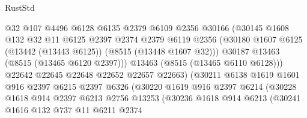 \begin{lexlean}{RustStd}
\begin{coremodule}
                              @32
                              @107
                              @4496
                              @6128
                              @6135
                              @2379
                              @6109
                              @2356
                              @30166
                              (@30145
                                @1608
                                @132
                                @32
                                @11
                                @6125
                                @2397
                                @2374
                                @2379
                                @6119
                                @2356
                                (@30180
                                  @1607
                                  @6125
                                  (@13442 (@13443 @6125))
                                  (@8515 (@13448 @1607 @32)))
                                @30187
                                @13463
                                (@8515 (@13465 @6120 @2397)))
                              @13463
                              (@8515 (@13465 @6110 @6128)))
                            @22642
                            @22645
                            @22648
                            @22652
                            @22657
                            @22663)
                          (@30211
                            @6138
                            @1619
                            @1601
                            @916
                            @2397
                            @6215
                            @2397
                            @6326
                            (@30220
                              @1619
                              @916
                              @2397
                              @6214
                              (@30228
                                @1618
                                @914
                                @2397
                                @6213
                                @2756
                                @13253
                                (@30236
                                  @1618
                                  @914
                                  @6213
                                  (@30241
                                    @1616
                                    @132
                                    @737
                                    @11
                                    @6211
                                    @2374

\end{coremodule}
\end{lexlean}
